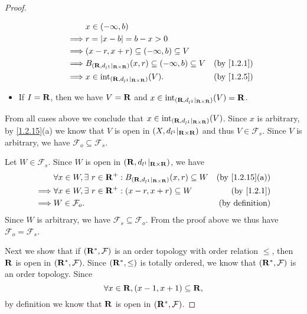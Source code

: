 \begin{proof}
\begin{itemize}
          \begin{align*}
                     & x \in (-\infty, b)                                                                                    \\
            \implies & r = \abs{x - b} = b - x > 0                                                                           \\
            \implies & (x - r, x + r) \subseteq (-\infty, b) \subseteq V                                                     \\
            \implies & B_{(\R, d_{l^1}|_{\R \times \R})}(x, r) \subseteq (-\infty, b) \subseteq V & \text{(by \cref{1.2.1})} \\
            \implies & x \in \text{int}_{(\R, d_{l^1}|_{\R \times \R})}(V).                       & \text{(by \cref{1.2.5})}
          \end{align*}
    \item If \(I = \mathbf{R}\), then we have \(V = \mathbf{R}\) and \(x \in \text{int}_{(\mathbf{R}, d_{l^1}|_{\mathbf{R} \times \mathbf{R}})}(V) = \mathbf{R}\).
  \end{itemize}
  From all cases above we conclude that \(x \in \text{int}_{(\mathbf{R}, d_{l^1}|_{\mathbf{R} \times \mathbf{R}})}(V)\).
  Since \(x\) is arbitrary, by \cref{1.2.15}(a) we know that \(V\) is open in \((X, d_{l^1}|_{\mathbf{R} \times \mathbf{R}})\) and thus \(V \in \mathcal{F}_s\).
  Since \(V\) is arbitrary, we have \(\mathcal{F}_o \subseteq \mathcal{F}_s\).

  Let \(W \in \mathcal{F}_s\).
  Since \(W\) is open in \((\mathbf{R}, d_{l^1}|_{\mathbf{R} \times \mathbf{R}})\), we have
  \begin{align*}
             & \forall x \in W, \exists\ r \in \R^+ : B_{(\R, d_{l^1}|_{\R \times \R})}(x, r) \subseteq W & \text{(by \cref{1.2.15}(a))} \\
    \implies & \forall x \in W, \exists\ r \in \R^+ : (x - r, x + r) \subseteq W                          & \text{(by \cref{1.2.1})}     \\
    \implies & W \in \mathcal{F}_o.                                                                       & \text{(by definition)}
  \end{align*}
  Since \(W\) is arbitrary, we have \(\mathcal{F}_s \subseteq \mathcal{F}_o\).
  From the proof above we thus have \(\mathcal{F}_o = \mathcal{F}_s\).

  Next we show that if \((\mathbf{R}^*, \mathcal{F})\) is an order topology with order relation \(\leq\), then \(\mathbf{R}\) is open in \((\mathbf{R}^*, \mathcal{F})\).
  Since \((\mathbf{R}^*, \leq)\) is totally ordered, we know that \((\mathbf{R}^*, \mathcal{F})\) is an order topology.
  Since
  \[
    \forall x \in \mathbf{R}, (x - 1, x + 1) \subseteq \mathbf{R},
  \]
  by definition we know that \(\mathbf{R}\) is open in \((\mathbf{R}^*, \mathcal{F})\).


\end{proof}
